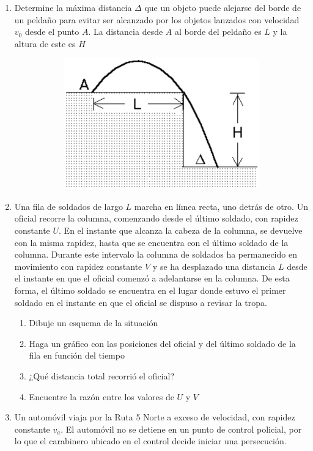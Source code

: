 \documentclass[letterpaper,11pt]{article}
\begin{document}
\begin{enumerate}
\item Determine la máxima distancia $\Delta$ que un objeto puede alejarse del borde de un peldaño para evitar ser alcanzado por los objetos lanzados con velocidad $v_0$ desde el punto $A$. La distancia desde $A$ al borde del peldaño es $L$ y la altura de este es $H$
\begin{figure}[H]
    \centering
    \begin{subfigure}[t]{1\textwidth}
        \centering
        \includegraphics[width=0.4\linewidth]{2022-1/img/aux2/peldanio.PNG}
    \end{subfigure}
\end{figure}

\item Una fila de soldados de largo $L$ marcha en líınea recta, uno detrás de otro. Un oficial recorre la columna, comenzando desde el último soldado, con rapidez constante $U$. En el instante que alcanza la cabeza de la columna, se devuelve con la misma rapidez, hasta que se encuentra con el último soldado de la columna. Durante este intervalo la columna de soldados ha permanecido en movimiento con rapidez constante $V$ y se ha desplazado una distancia $L$ desde el instante en que el oficial comenzó a adelantarse en la columna. De esta forma, el último soldado se encuentra en el lugar donde estuvo el primer soldado en el instante en que el oficial se dispuso a revisar la tropa.

\begin{enumerate}
    \item Dibuje un esquema de la situación
    \item Haga un gráfico con las posiciones del oficial y del último soldado de la fila en función del tiempo
    \item ¿Qué distancia total recorrió el oficial?
    \item Encuentre la razón entre los valores de $U$ y $V$
\end{enumerate}

\item Un automóvil viaja por la Ruta 5 Norte a exceso de velocidad, con rapidez constante $v_a$. El automóvil no se detiene en un punto de control policial, por lo que el carabinero ubicado en el control decide iniciar una persecución.


\end{enumerate}
\end{document}
